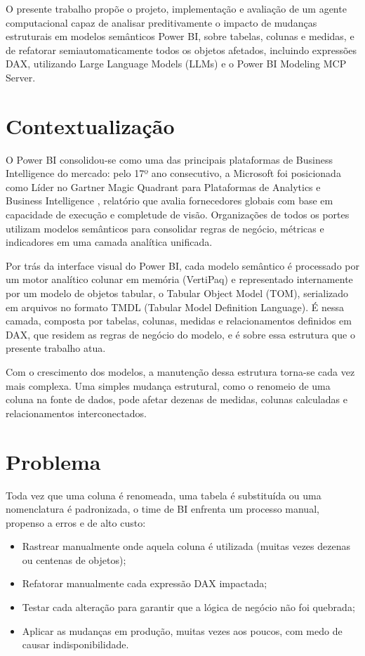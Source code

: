 \documentclass[
    12pt,               %
    openright,          %
    oneside,            %
    a4paper,            %
    chapter=TITLE,      %
    section=TITLE,      %
    brazil              %
]{abntex2}
\begin{document}
O presente trabalho propõe o projeto, implementação e avaliação de um agente computacional capaz de analisar preditivamente o impacto de mudanças estruturais em modelos semânticos Power BI, sobre tabelas, colunas e medidas, e de refatorar semiautomaticamente todos os objetos afetados, incluindo expressões DAX, utilizando Large Language Models (LLMs) e o Power BI Modeling MCP Server.

\section{Contextualização}

O Power BI consolidou-se como uma das principais plataformas de Business Intelligence do mercado: pelo 17º ano consecutivo, a Microsoft foi posicionada como Líder no Gartner Magic Quadrant para Plataformas de Analytics e Business Intelligence \cite{gartner2024magicquadrant}, relatório que avalia fornecedores globais com base em capacidade de execução e completude de visão. Organizações de todos os portes utilizam modelos semânticos para consolidar regras de negócio, métricas e indicadores em uma camada analítica unificada.

Por trás da interface visual do Power BI, cada modelo semântico é processado por um motor analítico colunar em memória (VertiPaq) e representado internamente por um modelo de objetos tabular, o Tabular Object Model (TOM), serializado em arquivos no formato TMDL (Tabular Model Definition Language). É nessa camada, composta por tabelas, colunas, medidas e relacionamentos definidos em DAX, que residem as regras de negócio do modelo, e é sobre essa estrutura que o presente trabalho atua.

Com o crescimento dos modelos, a manutenção dessa estrutura torna-se cada vez mais complexa. Uma simples mudança estrutural, como o renomeio de uma coluna na fonte de dados, pode afetar dezenas de medidas, colunas calculadas e relacionamentos interconectados.

\section{Problema}

Toda vez que uma coluna é renomeada, uma tabela é substituída ou uma nomenclatura é padronizada, o time de BI enfrenta um processo manual, propenso a erros e de alto custo:

\begin{itemize}
    \item Rastrear manualmente onde aquela coluna é utilizada (muitas vezes dezenas ou centenas de objetos);
    \item Refatorar manualmente cada expressão DAX impactada;
    \item Testar cada alteração para garantir que a lógica de negócio não foi quebrada;
    \item Aplicar as mudanças em produção, muitas vezes aos poucos, com medo de causar indisponibilidade.
\end{itemize}
\end{document}
